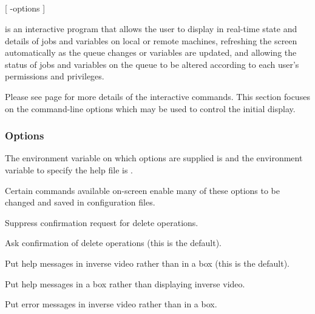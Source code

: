 \subsection{\BtqName}

\begin{expara}

\BtqName{} [ -options ]

\end{expara}

\PrBtq{} is an interactive program that allows the user to display in real-time state and details of
\ProductName{} jobs and variables on local or remote machines, refreshing the screen automatically as the queue
changes or variables are updated, and allowing the status of jobs and variables on the queue to be altered according to each
user's permissions and privileges.

Please see page \pageref{bkm:Btqdescr} for more details of the interactive commands.
This section focuses on the command-line options which may be used to control the initial display.

\subsubsection{Options}
The environment variable on which options are supplied is \filename{\BtqVarname} and the environment variable to specify the
help file is .

Certain commands available on-screen enable many of these options to be changed and saved in configuration files.

\explainopt


Suppress confirmation request for delete operations.


Ask confirmation of delete operations (this is the default).


Put help messages in inverse video rather than in a box (this is the default).


Put help messages in a box rather than displaying inverse video.


Put error messages in inverse video rather than in a box.

